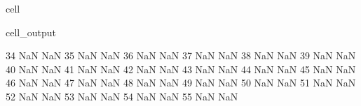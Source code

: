 \documentclass[letterpaper,10pt,english]{jupyterBook}
\begin{document}
\begin{sphinxuseclass}{cell}
\begin{sphinxVerbatimOutput}
\begin{sphinxuseclass}{cell_output}
\begin{sphinxVerbatim}[commandchars=\\\{\}]
					34                     NaN                          NaN   
					35                     NaN                          NaN   
					36                     NaN                          NaN   
					37                     NaN                          NaN   
					38                     NaN                          NaN   
					39                     NaN                          NaN   
					40                     NaN                          NaN   
					41                     NaN                          NaN   
					42                     NaN                          NaN   
					43                     NaN                          NaN   
					44                     NaN                          NaN   
					45                     NaN                          NaN   
					46                     NaN                          NaN   
					47                     NaN                          NaN   
					48                     NaN                          NaN   
					49                     NaN                          NaN   
					50                     NaN                          NaN   
					51                     NaN                          NaN   
					52                     NaN                          NaN   
					53                     NaN                          NaN   
					54                     NaN                          NaN   
					55                     NaN                          NaN   
					

\end{sphinxVerbatim}
\end{sphinxuseclass}
\end{sphinxVerbatimOutput}
\end{sphinxuseclass}
\end{document}
